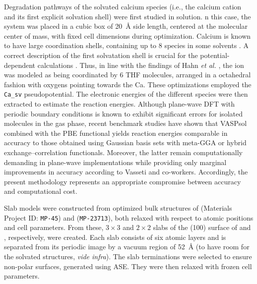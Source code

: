 \documentclass[twoside,twocolumn,9pt]{article}
\begin{document}
Degradation pathways of the solvated calcium species (i.e., the calcium cation and its first explicit solvation shell) were first studied in solution.
n this case, the system was placed in a cubic box of \SI{20}{\angstrom} side length, centered at the molecular center of mass, with fixed cell dimensions during optimization.
Calcium is known to have large coordination shells, containing up to 8 species in some solvents \cite{shakourian-fardCalciumIonBatteriesIdentifying2019}.
A correct description of the first solvatation shell is crucial for the potential-dependent calculations \cite{hagopianAdvancementHomogeneousBackground2022}.
Thus, in line with the findings of Hahn \textit{et al.} \cite{hahnCriticalRoleConfigurational2020}, the  ion was modeled as being coordinated by 6 THF molecules, arranged in a octahedral fashion with oxygens pointing towards the Ca.
These optimizations employed the \texttt{Ca\_sv} pseudopotential.
The electronic energies of the different species were then extracted to estimate the reaction energies.
Although plane-wave DFT with periodic boundary conditions is known to exhibit significant errors for isolated molecules in the gas phase, recent benchmark studies\cite{vassettiGeneralizingContinuumSolvation2021,sandoval-paukerComputingStandardReduction2025} have shown that VASPsol combined with the PBE functional yields reaction energies comparable in accuracy to those obtained using Gaussian basis sets with meta-GGA or  hybrid exchange--correlation functionals.
Moreover, the latter remain computationally demanding in plane-wave implementations while providing only marginal improvements in accuracy according to Vasseti and co-workers.\cite{sandoval-paukerComputingStandardReduction2025}
Accordingly, the present methodology represents an appropriate compromise between accuracy and computational cost.

Slab models were constructed from optimized bulk structures of  (Materials Project \cite{hortonAcceleratedDatadrivenMaterials2025} ID: \texttt{MP-45}) and  (\texttt{MP-23713}), both relaxed with respect to atomic positions and cell parameters. 
From these, $3 \times 3$ and $2 \times 2$ slabs of the (100) surface of  and , respectively, were created. Each slab consists of six atomic layers and is separated from its periodic image by a vacuum region of \SI{52}{\angstrom} (to have room for the solvated structures, \textit{vide infra}). 
The slab terminations were selected to ensure non-polar surfaces, generated using ASE. They were then relaxed with frozen cell parameters.
\end{document}
